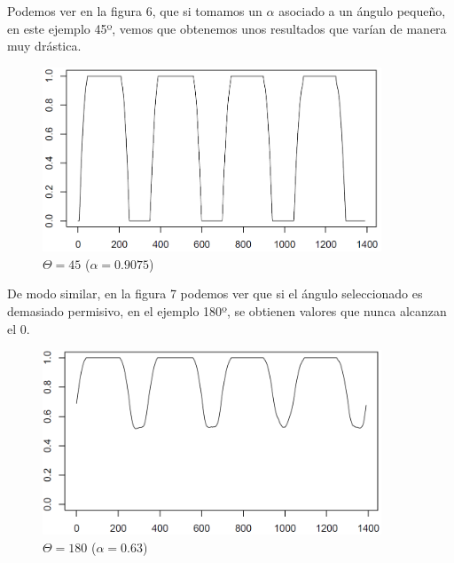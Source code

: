 Podemos ver en la figura 6, que si tomamos un $\alpha$ asociado a un ángulo pequeño, en este ejemplo 45º, vemos que obtenemos unos resultados que varían de manera muy drástica.

\begin{figure}[H]
\begin{center}

\includegraphics[width=0.9\textwidth]{img/lin-dev3-1-limpio-09075.png}
\end{center}

\caption{$\Theta = 45$ ($\alpha = 0.9075$)}
\end{figure}

De modo similar, en la figura 7 podemos ver que si el ángulo seleccionado es demasiado permisivo, en el ejemplo 180º, se obtienen valores que nunca alcanzan el 0.\\

\begin{figure}[H]
\begin{center}

\includegraphics[width=0.9\textwidth]{img/lin-dev3-1-limpio-063.png}
\end{center}

\caption{$\Theta = 180$ ($\alpha = 0.63$)}
\end{figure}

